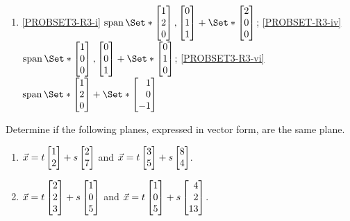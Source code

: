 \begin{exercises}
\begin{problist}
\begin{solution}
\begin{enumerate}
\begin{enumerate}
				\end{enumerate}
				\item 
					\ref{PROBSET3-R3-i} $\Span\Set*{\mat{1\\2\\0}, \mat{0\\1\\1}} + \Set*{\mat{2\\0\\0}}$;
					\ref{PROBSET-R3-iv} $\Span\Set*{\mat{1\\0\\0}, \mat{0\\0\\1}} + \Set*{\mat{0\\1\\0}}$;
					\ref{PROBSET3-R3-vi} $\Span\Set*{\mat{1\\2\\0}} + \Set*{\mat{1\\0\\-1}}$
			\end{enumerate}
		\end{solution}
		
		\prob Determine if the following planes, expressed in vector form, are the same plane.
		\begin{enumerate}
			\item $\vec x = t\mat{1\\2}+ s\mat{2\\7}$ and $\vec x =
			t\mat{3\\5}+ s\mat{8\\4}$.
			
			\item $\vec x = t\mat{2\\2\\3}+ s\mat{1\\0\\5}$ and $\vec
			x = t\mat{1\\0\\5}+ s\mat{4\\2\\13}$.
			

\end{enumerate}
\end{problist}
\end{exercises}
